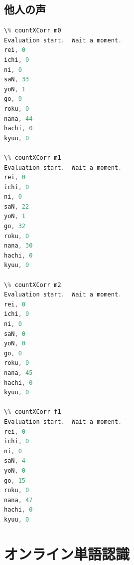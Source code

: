 \documentclass[11pt,a4paper, uplatex]{jsarticle}
\begin{document}
\subsection{他人の声}
\begin{lstlisting}[language=c, caption=\texttt{countXCorr}実行結果]
\% countXCorr m0
Evaluation start.  Wait a moment.
rei, 0
ichi, 0
ni, 0
saN, 33
yoN, 1
go, 9
roku, 0
nana, 44
hachi, 0
kyuu, 0

\% countXCorr m1
Evaluation start.  Wait a moment.
rei, 0
ichi, 0
ni, 0
saN, 22
yoN, 1
go, 32
roku, 0
nana, 30
hachi, 0
kyuu, 0

\% countXCorr m2
Evaluation start.  Wait a moment.
rei, 0
ichi, 0
ni, 0
saN, 0
yoN, 0
go, 0
roku, 0
nana, 45
hachi, 0
kyuu, 0

\% countXCorr f1
Evaluation start.  Wait a moment.
rei, 0
ichi, 0
ni, 0
saN, 4
yoN, 0
go, 15
roku, 0
nana, 47
hachi, 0
kyuu, 0

\end{lstlisting}

\section{オンライン単語認識}
\end{document}
